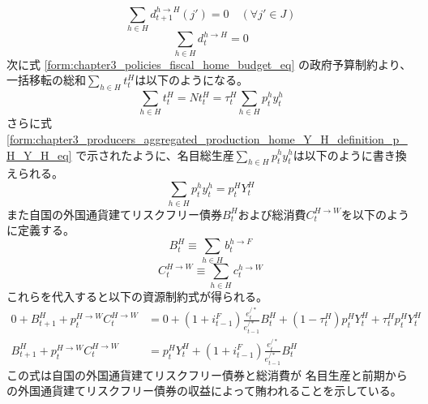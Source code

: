 \begin{equation}
\label{form:chapter3_resource_constraints_aggregate_home_equilibrium_eq}
    \sum_{h\in H}d_{t+1}^{h\to H}(j')=0\quad (\forall j'\in J)
\end{equation}
\begin{equation}
\label{form:chapter3_resource_constraints_aggregate_home_equilibrium2_eq}
    \sum_{h\in H}d_t^{h\to H}=0
\end{equation}
次に式
\eqref{form:chapter3_policies_fiscal_home_budget_eq}
の政府予算制約より、一括移転の総和\(\sum_{h\in H}t_t^H\)は以下のようになる。
\begin{equation}
\label{form:chapter3_resource_constraints_aggregate_home_fiscal_budget_eq}
    \sum_{h\in H}t_t^H=Nt_t^H=\tau_t^H\sum_{h\in H}p_t^hy_t^h
\end{equation}
さらに式
\eqref{form:chapter3_producers_aggregated_production_home_Y_H_definition_p_H_Y_H_eq}
で示されたように、名目総生産\(\sum_{h\in H}p_t^hy_t^h\)は以下のように書き換えられる。
\begin{equation}
\label{form:chapter3_resource_constraints_aggregate_home_p_H_Y_H_eq}
    \sum_{h\in H}p_t^hy_t^h=p_t^HY_t^H
\end{equation}
また自国の外国通貨建てリスクフリー債券\(B_t^H\)および総消費\(C_t^{H\to W}\)を以下のように定義する。
\begin{equation}
\label{form:chapter3_resource_constraints_aggregate_home_B_H_def}
    B_t^H\equiv\sum_{h\in H}b_t^{h\to F}
\end{equation}
\begin{equation}
\label{form:chapter3_resource_constraints_aggregate_home_C_H_W_def}
    C_t^{H\to W}\equiv\sum_{h\in H}c_t^{h\to W}
\end{equation}
これらを代入すると以下の資源制約式が得られる。
\begin{align}
    \label{form:chapter3_resource_constraints_aggregate_home_sum_budgets_modified2_eq}
        0+B_{t+1}^H+p_t^{H\to W}C_t^{H\to W}
        &=0+(1+i_{t-1}^F)\frac{e_t^{/*}}{e_{t-1}^{/*}}B_t^H+(1-\tau_t^H)p_t^HY_t^H+\tau_t^Hp_t^HY_t^H \\
    \label{form:chapter3_resource_constraints_aggregate_home_sum_budgets_modified3_eq}
        B_{t+1}^H+p_t^{H\to W}C_t^{H\to W}
        &=p_t^HY_t^H+(1+i_{t-1}^F)\frac{e_t^{/*}}{e_{t-1}^{/*}}B_t^H
\end{align}
この式は自国の外国通貨建てリスクフリー債券と総消費が
名目生産と前期からの外国通貨建てリスクフリー債券の収益によって賄われることを示している。

